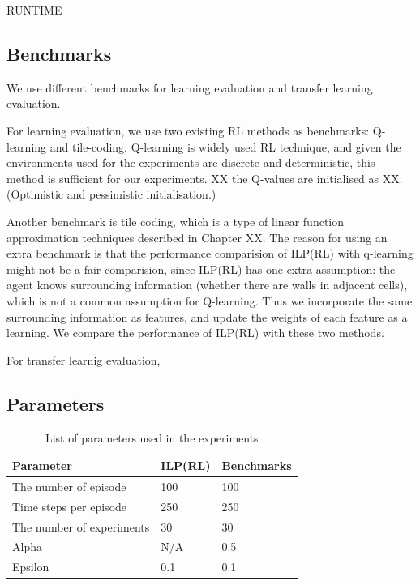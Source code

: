 RUNTIME

\subsection{Benchmarks}
\label{subsec:benchmarks}
We use different benchmarks for learning evaluation and transfer learning evaluation. 

For learning evaluation, we use two existing RL methods as benchmarks: Q-learning and tile-coding.
Q-learning is widely used RL technique, and given the environments used for the experiments are discrete and deterministic, this method is sufficient for our experiments.
XX the Q-values are initialised as XX. (Optimistic and pessimistic initialisation.)

Another benchmark is tile coding, which is a type of linear function approximation techniques described in Chapter XX.
The reason for using an extra benchmark is that the performance comparision of ILP(RL) with q-learning might not be a fair comparision,
since ILP(RL) has one extra assumption: the agent knows surrounding information (whether there are walls in adjacent cells),
which is not a common assumption for Q-learning. Thus we incorporate the same surrounding information as features, and update the weights of each feature as a learning.
We compare the performance of ILP(RL) with these two methods.

For transfer learnig evaluation, 

\subsection{Parameters}
\begin{table}[!ht!b]
\centering
\begin{tabular}{lll}
\hline
Parameter            & ILP(RL)    & Benchmarks      \\ \hline
The number of episode& 100        & 100        \\
Time steps per episode& 250        & 250        \\
The number of experiments& 30       & 30       \\
Alpha                & N/A       & 0.5       \\
Epsilon              & 0.1        & 0.1        \\
\end{tabular}
\caption{List of parameters used in the experiments}
\label{param}
\end{table}


